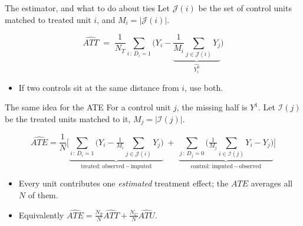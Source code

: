 \documentclass[
  11pt,
  ignorenonframetext,
  aspectratio=169,
]{beamer}
\providecommand{\tightlist}{%
  \setlength{\itemsep}{0pt}\setlength{\parskip}{0pt}}
\begin{document}
\begin{frame}{The estimator, and what to do about ties}
\protect{}\label{the-estimator-and-what-to-do-about-ties}
Let \(\mathcal{J}(i)\) be the set of control units matched to treated
unit \(i\), and \(M_i = |\mathcal{J}(i)|\).

\[
\widehat{ATT} \;=\; \frac{1}{N_T}\sum_{i\,:\,D_i = 1}
\Bigg( Y_i - \underbrace{\frac{1}{M_i}\sum_{j \in \mathcal{J}(i)} Y_j}_{\widehat{Y^0_i}} \Bigg)
\]

\begin{itemize}
\tightlist
\item
  If two controls sit at the same distance from \(i\), use both.
\end{itemize}
\end{frame}

\begin{frame}{The same idea for the ATE}
\protect{}\label{the-same-idea-for-the-ate}
For a control unit \(j\), the missing half is \(Y^1\). Let
\(\mathcal{I}(j)\) be the treated units matched to it,
\(M_j = |\mathcal{I}(j)|\).

\[
\widehat{ATE} = \frac{1}{N}\Bigg[
\underbrace{\sum_{i\,:\,D_i=1}\Big( Y_i - \tfrac{1}{M_i}\!\!\sum_{j \in \mathcal{J}(i)}\!\! Y_j \Big)}_{\text{treated: observed} \,-\, \text{imputed}}
\;+\;
\underbrace{\sum_{j\,:\,D_j=0}\Big( \tfrac{1}{M_j}\!\!\sum_{i \in \mathcal{I}(j)}\!\! Y_i - Y_j \Big)}_{\text{control: imputed} \,-\, \text{observed}}
\Bigg]
\]

\begin{itemize}
\tightlist
\item
  Every unit contributes one \emph{estimated} treatment effect; the
  \(ATE\) averages all \(N\) of them.
\item
  Equivalently
  \(\widehat{ATE} = \frac{N_T}{N}\widehat{ATT} + \frac{N_C}{N}\widehat{ATU}\).
\end{itemize}
\end{frame}
\end{document}
